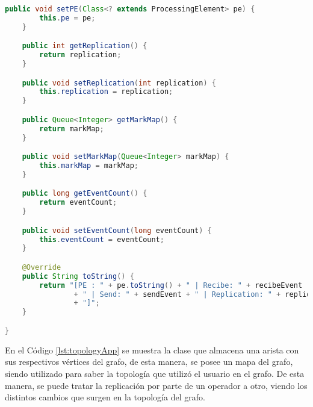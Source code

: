 \begin{lstlisting}[caption={Clase StatusPE, el cual contiene las estadísticas de un PE específico.},label={lst:statusPE},language=Java]
	public void setPE(Class<? extends ProcessingElement> pe) {
		this.pe = pe;
	}

	public int getReplication() {
		return replication;
	}

	public void setReplication(int replication) {
		this.replication = replication;
	}

	public Queue<Integer> getMarkMap() {
		return markMap;
	}

	public void setMarkMap(Queue<Integer> markMap) {
		this.markMap = markMap;
	}

	public long getEventCount() {
		return eventCount;
	}

	public void setEventCount(long eventCount) {
		this.eventCount = eventCount;
	}

	@Override
	public String toString() {
		return "[PE : " + pe.toString() + " | Recibe: " + recibeEvent
				+ " | Send: " + sendEvent + " | Replication: " + replication
				+ "]";
	}

}

\end{lstlisting}

En el Código \ref{lst:topologyApp} se muestra la clase que almacena una arista con sus respectivos vértices del grafo, de esta manera, se posee un mapa del grafo, siendo utilizado para saber la topología que utilizó el usuario en el grafo. De esta manera, se puede tratar la replicación por parte de un operador a otro, viendo los distintos cambios que surgen en la topología del grafo.


